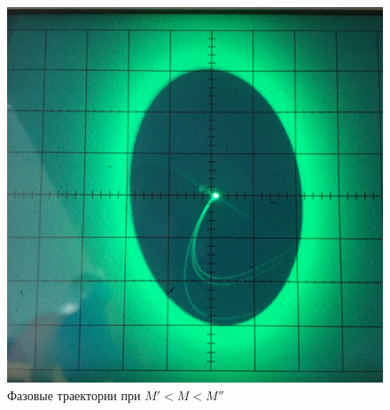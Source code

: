 \begin{figure}[h!]
\begin{minipage}{0.32\linewidth}
	\end{minipage}
	\begin{minipage}{0.32\linewidth}
	\includegraphics[width=\linewidth]{photo/task3b(midL).jpg}
	\end{minipage}
	\caption{Фазовые траектории при $M'<M<M''$}
	\label{fig14}
\end{figure}
